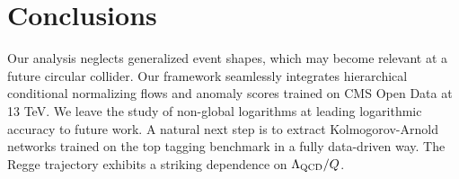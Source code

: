 \section{Conclusions}\label{sec:conclusions}

Our analysis neglects generalized event shapes, which may become
relevant at a future circular collider. Our framework seamlessly
integrates hierarchical conditional normalizing flows and anomaly scores
trained on CMS Open Data at 13 TeV. We leave the study of non-global
logarithms at leading logarithmic accuracy to future work. A natural
next step is to extract Kolmogorov-Arnold networks trained on the top
tagging benchmark in a fully data-driven way. The Regge trajectory
exhibits a striking dependence on $\Lambda_{\rm QCD}/Q$.

